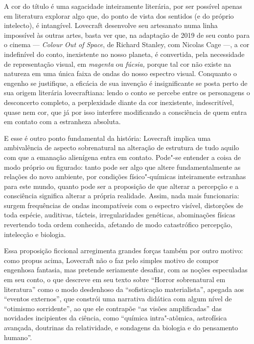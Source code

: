 A cor do título é uma sagacidade inteiramente literária, por ser
possível apenas em literatura explorar algo que, do ponto de vista dos
sentidos (e do próprio intelecto), é intangível. Lovecraft desenvolve
seu artesanato numa linha impossível às outras artes, basta ver que, na
adaptação de 2019 de seu conto para o cinema --- \emph{Colour Out of
Space}, de Richard Stanley, com Nicolas Cage ---, a cor indefinível do
conto, inexistente no nosso planeta, é convertida, pela necessidade de
representação visual, em \emph{magenta} ou \emph{fúcsia,} porque tal cor
não existe na natureza em uma única faixa de ondas do nosso espectro
visual. Conquanto o engenho se justifique, a eficácia de sua invenção é
insignificante se posta perto de sua origem literária lovecraftiana:
lendo o conto se percebe entre os personagens o desconcerto completo, a
perplexidade diante da cor inexistente, indescritível, quase nem cor,
que já por isso interfere modificando a consciência de quem entra em
contato com a estranheza absoluta.

E esse é outro ponto fundamental da história: Lovecraft implica uma
ambivalência de aspecto sobrenatural na alteração de estrutura de tudo
aquilo com que a emanação alienígena entra em contato. Pode"-se entender
a coisa de modo próprio ou figurado: tanto pode ser algo que altere
fundamentalmente as relações do novo ambiente, por condições
físico"-químicas inteiramente estranhas para este mundo, quanto pode ser
a proposição de que alterar a percepção e a consciência significa
alterar a própria realidade. Assim, nada mais funcionaria: surgem
frequências de ondas incompatíveis com o espectro visível, distorções de
toda espécie, auditivas, tácteis, irregularidades genéticas, abominações
físicas revertendo toda ordem conhecida, afetando de modo catastrófico
percepção, intelecção e biologia.

Essa proposição ficcional arregimenta grandes forças também por outro
motivo: como propus acima, Lovecraft não o faz pelo simples motivo de
compor engenhosa fantasia, mas pretende seriamente desafiar, com as
noções especuladas em seu conto, o que descreve em seu texto sobre
``Horror sobrenatural em literatura'' como o modo desdenhoso da
``sofisticação materialista'', apegada aos ``eventos externos'', que
constrói uma narrativa didática com algum nível de ``otimismo
sorridente'', ao que ele contrapõe ``as visões amplificadas'' das
novidades incipientes da ciência, como ``química intra"-atômica,
astrofísica avançada, doutrinas da relatividade, e sondagens da biologia
e do pensamento humano''.

